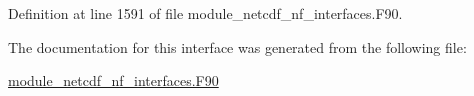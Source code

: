 Definition at line 1591 of file module\+\_\+netcdf\+\_\+nf\+\_\+interfaces.\+F90.



The documentation for this interface was generated from the following file\+:\begin{DoxyCompactItemize}
\item 
\hyperlink{module__netcdf__nf__interfaces_8F90}{module\+\_\+netcdf\+\_\+nf\+\_\+interfaces.\+F90}\end{DoxyCompactItemize}
